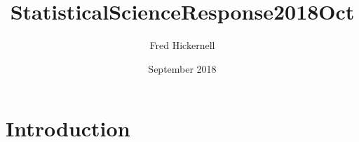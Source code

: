 \documentclass{article}
\title{StatisticalScienceResponse2018Oct}
\author{Fred Hickernell}
\date{September 2018}
\begin{document}
\maketitle

\section{Introduction}
\end{document}
